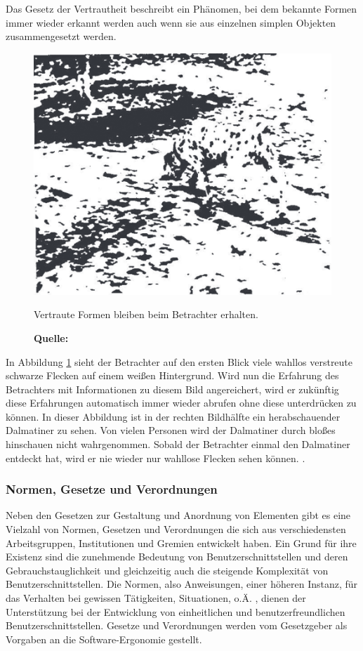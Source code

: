 Das Gesetz der Vertrautheit beschreibt ein Phänomen, bei dem bekannte Formen immer wieder erkannt werden auch wenn sie aus einzelnen simplen Objekten zusammengesetzt werden.
\begin{figure}[H]
  \centering
  \includegraphics[scale=0.7]{img/gesetz_der_Vertrautheit.PNG}
  \caption{Vertraute Formen bleiben beim Betrachter erhalten.}
  \caption*{\textbf{Quelle:} \citep{Dahm2006}}
  \label{fig:vertrautheit}
\end{figure}
In Abbildung \ref{fig:vertrautheit} sieht der Betrachter auf den ersten Blick viele wahllos verstreute schwarze Flecken auf einem weißen Hintergrund. Wird nun die Erfahrung des Betrachters mit Informationen zu diesem Bild angereichert, wird er zukünftig diese Erfahrungen automatisch immer wieder abrufen ohne diese unterdrücken zu können. In dieser Abbildung ist in der rechten Bildhälfte ein herabschauender Dalmatiner zu sehen. Von vielen Personen wird der Dalmatiner durch bloßes hinschauen nicht wahrgenommen. Sobald der Betrachter einmal den Dalmatiner entdeckt hat, wird er nie wieder nur wahllose Flecken sehen können. \citep[vgl.][63f]{Dahm2006}.

\subsubsection{Normen, Gesetze und Verordnungen}
Neben den Gesetzen zur Gestaltung und Anordnung von Elementen gibt es eine Vielzahl von Normen, Gesetzen und Verordnungen die sich aus verschiedensten Arbeitsgruppen, Institutionen und Gremien entwickelt haben. Ein Grund für ihre Existenz sind die zunehmende Bedeutung von Benutzerschnittstellen und deren Gebrauchstauglichkeit und gleichzeitig auch die steigende Komplexität von Benutzerschnittstellen. Die Normen, also Anweisungen, einer höheren Instanz, für das Verhalten bei gewissen Tätigkeiten, Situationen, o.Ä. \citep[vgl.][]{duden}, dienen der Unterstützung bei der Entwicklung von einheitlichen und benutzerfreundlichen Benutzerschnittstellen. Gesetze und Verordnungen werden vom Gesetzgeber als Vorgaben an die Software-Ergonomie gestellt.


